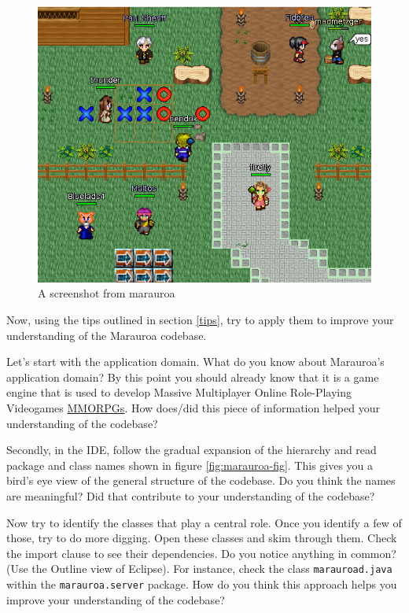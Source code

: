 \documentclass[
]{book}
\begin{document}
\begin{figure}

{\centering \includegraphics[width=1\linewidth]{images/marauroa2} 

}

\caption{A screenshot from marauroa}\label{fig:marauroa2-fig}
\end{figure}

Now, using the tips outlined in section \ref{tips}, try to apply them to improve your understanding of the Marauroa codebase.

Let's start with the application domain. What do you know about Marauroa's application domain? By this point you should already know that it is a game engine that is used to develop Massive Multiplayer Online Role-Playing Videogames \href{https://en.wikipedia.org/wiki/Massively_multiplayer_online_role-playing_game}{MMORPGs}. How does/did this piece of information helped your understanding of the codebase?

Secondly, in the IDE, follow the gradual expansion of the hierarchy and read package and class names shown in figure \ref{fig:marauroa-fig}. This gives you a bird's eye view of the general structure of the codebase. Do you think the names are meaningful? Did that contribute to your understanding of the codebase?

Now try to identify the classes that play a central role. Once you identify a few of those, try to do more digging. Open these classes and skim through them. Check the import clause to see their dependencies. Do you notice anything in common? (Use the Outline view of Eclipse). For instance, check the class \texttt{marauroad.java} within the \texttt{marauroa.server} package. How do you think this approach helps you improve your understanding of the codebase?
\end{document}
